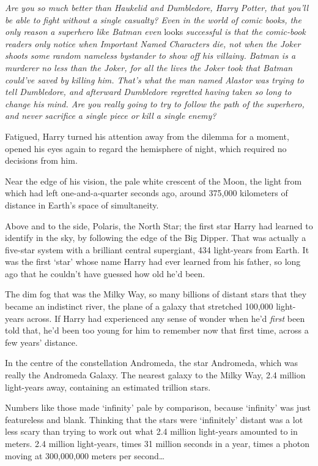 \emph{Are you so much better than Haukelid and Dumbledore, Harry Potter,
that you'll be able to fight without a single casualty? Even in the
world of comic books, the only reason a superhero like Batman even}
looks \emph{successful is that the comic-book readers only notice when
Important Named Characters die, not when the Joker shoots some random
nameless bystander to show off his villainy. Batman is a murderer no
less than the Joker, for all the lives the Joker took that Batman
could've saved by killing him. That's what the man named Alastor was
trying to tell Dumbledore, and afterward Dumbledore regretted having
taken so long to change his mind. Are you really going to try to follow
the path of the superhero, and never sacrifice a single piece or kill a
single enemy?}

Fatigued, Harry turned his attention away from the dilemma for a moment,
opened his eyes again to regard the hemisphere of night, which required
no decisions from him.

Near the edge of his vision, the pale white crescent of the Moon, the
light from which had left one-and-a-quarter seconds ago, around 375,000
kilometers of distance in Earth's space of simultaneity.

Above and to the side, Polaris, the North Star; the first star Harry had
learned to identify in the sky, by following the edge of the Big Dipper.
That was actually a five-star system with a brilliant central
supergiant, 434 light-years from Earth. It was the first `star' whose
name Harry had ever learned from his father, so long ago that he
couldn't have guessed how old he'd been.

The dim fog that was the Milky Way, so many billions of distant stars
that they became an indistinct river, the plane of a galaxy that
stretched 100,000 light-years across. If Harry had experienced any sense
of wonder when he'd \emph{first} been told that, he'd been too young for
him to remember now that first time, across a few years' distance.

In the centre of the constellation Andromeda, the star Andromeda, which
was really the Andromeda Galaxy. The nearest galaxy to the Milky Way,
2.4 million light-years away, containing an estimated trillion stars.

Numbers like those made `infinity' pale by comparison, because
`infinity' was just featureless and blank. Thinking that the stars were
`infinitely' distant was a lot less scary than trying to work out what
2.4 million light-years amounted to in meters. 2.4 million light-years,
times 31 million seconds in a year, times a photon moving at 300,000,000
meters per second\ldots{}


